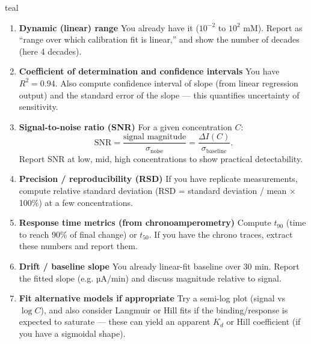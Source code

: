 \begin{color}{teal}
\begin{enumerate}
    \item \textbf{Dynamic (linear) range}  
    You already have it (\(10^{-2}\) to \(10^{2}\) mM). Report as “range over which calibration fit is linear,” and show the number of decades (here 4 decades).

    \item \textbf{Coefficient of determination and confidence intervals}  
    You have \(R^2=0.94\). Also compute confidence interval of slope (from linear regression output) and the standard error of the slope — this quantifies uncertainty of sensitivity.

    \item \textbf{Signal-to-noise ratio (SNR)}  
    For a given concentration \(C\):
    \[
    \text{SNR}=\frac{\text{signal magnitude}}{\sigma_\text{noise}}=\frac{\Delta I(C)}{\sigma_\text{baseline}}.
    \]
    Report SNR at low, mid, high concentrations to show practical detectability.

    \item \textbf{Precision / reproducibility (RSD)}  
    If you have replicate measurements, compute relative standard deviation (RSD = standard deviation / mean $\times$ 100\%) at a few concentrations.

    \item \textbf{Response time metrics (from chronoamperometry)}  
    Compute \(t_{90}\) (time to reach 90\% of final change) or \(t_{50}\). If you have the chrono traces, extract these numbers and report them.

    \item \textbf{Drift / baseline slope}  
    You already linear-fit baseline over 30 min. Report the fitted slope (e.g. µA/min) and discuss magnitude relative to signal.

    \item \textbf{Fit alternative models if appropriate}  
    Try a semi-log plot (signal vs \(\log C\)), and also consider Langmuir or Hill fits if the binding/response is expected to saturate — these can yield an apparent \(K_d\) or Hill coefficient (if you have a sigmoidal shape).
\end{enumerate}

\bigskip


\end{color}
